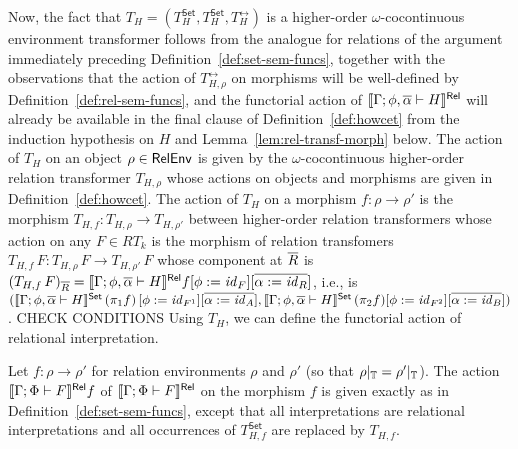 \documentclass{lmcs}
\theoremstyle{plain}\newtheorem{satz}[thm]{Satz}
\newcommand{\set}{\mathsf{Set}}
\renewcommand{\id}{\mathit{id}}
\begin{document}
{Now, the fact that $T_H = (T^\set_H, T^\set_H, T^\rel_H) $ is a
higher-order $\omega$-cocontinuous environment transformer follows
from the analogue for relations of the argument immediately preceding
Definition~\ref{def:set-sem-funcs}, together with the observations
that the action of $T^\rel_{H,\rho}$ on morphisms will be well-defined
by Definition~\ref{def:rel-sem-funcs}, and the functorial action of
$\llbracket{\Gamma; \phi,\overline{\alpha} \vdash H}\rrbracket^{\mathsf{Rel}}$ will already be available
in the final clause of Definition~\ref{def:howcet} from the induction
hypothesis on $H$ and Lemma~\ref{lem:rel-transf-morph} below. The
action of $T_H$ on an object $\rho \in \mathsf{RelEnv}$ is given by the
$\omega$-cocontinuous higher-order relation transformer $T_{H,\rho}$
whose actions on objects and morphisms are given in
Definition~\ref{def:howcet}. The action of $T_H$ on a morphism $f :
\rho \to \rho'$ is the morphism $T_{H,f} : T_{H,\rho} \to T_{H,\rho'}$
between higher-order relation transformers whose action on any $F \in
RT_k$ is the morphism of relation transfomers $T_{H,f}\, F :
T_{H,\rho}\, F \to T_{H,\rho'}\, F$ whose component at $\overline{R}$ is
$(T_{H,f}\, F)_{\ol{R}} = \relsem{\Gamma; \phi,\ol{\alpha} \vdash
  H}f[\phi := \id_F][\ol{\alpha := \id_R}]$, i.e., is
$(\setsem{\Gamma; \phi,\ol{\alpha} \vdash H}\,(\pi_1 f)\,[\phi :=
  \id_{F^1}][\ol{\alpha := \id_A}], \setsem{\Gamma; \phi,\ol{\alpha}
  \vdash H}\,(\pi_2 f)[\phi := \id_{F^2}][\ol{\alpha := \id_B}])$.
{\color{red} CHECK CONDITIONS} Using $T_H$, we can define the
functorial action of relational interpretation.
\begin{defi}\label{def:rel-sem-funcs}
Let $f: \rho \to \rho'$ for relation environments $\rho$ and $\rho'$
(so that $\rho|_{\mathbb{T}} = \rho'|_{\mathbb{T}}$). The action
$\llbracket{\Gamma;\Phi \vdash F}\rrbracket^{\mathsf{Rel}}f$ of $\llbracket{\Gamma;\Phi \vdash F}\rrbracket^{\mathsf{Rel}}$ on
the morphism $f$ is given exactly as in
Definition~\ref{def:set-sem-funcs}, except that all interpretations
are relational interpretations and all occurrences of $T^\set_{H,f}$
are replaced by $T_{H,f}$.
\begin{comment}
as follows:
\begin{itemize}
\item If \,$\Gamma;\Phi \vdash \zerot$ then $\relsem{\Gamma;\Phi \vdash
  \zerot}f = \id_0$
\item If\, $\Gamma;\Phi \vdash \onet$ then $\relsem{\Gamma;\Phi \vdash
  \onet}f = \id_1$
\item If \,$\Gamma; \Phi
  \vdash \Nat^{\ol{\alpha}}\,F\,G$ then
  $\relsem{\Gamma; \Phi
    \vdash \Nat^{\ol{\alpha}}\,F\,G} f =$\\

\end{comment}
\end{defi}}
\end{document}

